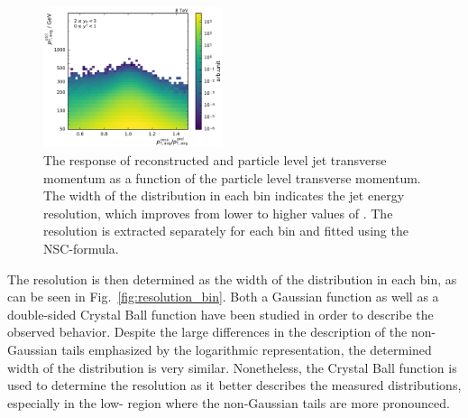 \begin{figure}[htbp]
    \includegraphics[width=0.47\textwidth]{figures/measurement/gen_vs_reco_vs_gen_ptavg_yb2ys0.pdf}
    \caption[Comparison of particle level and reconstructed dijet transverse momentum]
            {The response of reconstructed and particle level jet transverse
                momentum as a function of the particle level transverse momentum.
                The width of the distribution in each \ptavg bin indicates the
                jet energy resolution, which improves from lower to higher values of \ptavg. The
                resolution is extracted separately for each bin and
                fitted using the NSC-formula.}
    \label{fig:gen_vs_reco_over_gen}
\end{figure}

The resolution is then determined as the width of the distribution in each \ptavg
bin, as can be seen in Fig.~\ref{fig:resolution_bin}. Both a Gaussian function
as well as a double-sided Crystal Ball function have been studied in order to
describe the observed behavior. Despite the large differences in the
description of the non-Gaussian tails emphasized by the logarithmic
representation, the determined width of the distribution is very similar.
Nonetheless, the Crystal Ball function is used to determine the resolution as
it better describes the measured distributions, especially in the low-\pt
region where the non-Gaussian tails are more pronounced.

